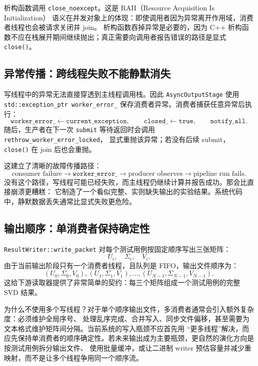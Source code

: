 析构函数调用 \texttt{close\_noexcept}。这是 RAII（Resource Acquisition Is Initialization）
语义在并发对象上的体现：即使调用者因为异常离开作用域，消费者线程也会被请求关闭并 join。
析构函数吞掉异常是必要的，因为 C++ 析构函数不应在栈展开期间继续抛出；真正需要向调用者报告错误的路径是显式
\texttt{close()}。

\subsection{异常传播：跨线程失败不能静默消失}

写线程中的异常无法直接穿透到主线程调用栈。因此 \texttt{AsyncOutputStage} 使用
\texttt{std::exception\_ptr worker\_error\_} 保存消费者异常。消费者捕获任意异常后执行：
\[
    \texttt{worker\_error\_} \leftarrow \texttt{current\_exception},
    \qquad
    \texttt{closed\_} \leftarrow \texttt{true},
    \qquad
    \texttt{notify\_all}.
\]
随后，生产者在下一次 \texttt{submit} 等待返回时会调用 \texttt{rethrow\_worker\_error\_locked}，
显式重抛该异常；若没有后续 submit，\texttt{close()} 在 join 后也会重抛。

这建立了清晰的故障传播路径：
\[
    \text{consumer failure}
    \longrightarrow
    \texttt{worker\_error\_}
    \longrightarrow
    \text{producer observes}
    \longrightarrow
    \text{pipeline run fails}.
\]
没有这个路径，写线程可能已经失败，而主线程仍继续计算并报告成功。那会比直接崩溃更糟糕：
它制造了一个看似完整、实则缺失输出的实验结果。系统代码中，静默数据丢失通常比显式失败更危险。

\subsection{输出顺序：单消费者保持确定性}

\texttt{ResultWriter::write\_packet} 对每个测试用例按固定顺序写出三张矩阵：
\[
    U_i,\quad \Sigma_i,\quad V_i.
\]
由于当前输出阶段只有一个消费者线程，且队列是 FIFO，输出文件顺序为：
\[
    (U_0,\Sigma_0,V_0),
    (U_1,\Sigma_1,V_1),
    \ldots,
    (U_{N-1},\Sigma_{N-1},V_{N-1}).
\]
这给下游读取器提供了非常简单的契约：每三个矩阵组成一个测试用例的完整 SVD 结果。

为什么不使用多个写线程？对于单个顺序输出文件，多消费者通常会引入额外复杂度：必须维护全局序号、
处理乱序完成、合并写入、同步文件偏移，甚至需要为文本格式维护矩阵间分隔。当前系统的写入瓶颈不应首先用
“更多线程”解决，而应先保持单消费者的顺序确定性。若未来输出成为主要瓶颈，更自然的演化方向是按测试用例拆分输出文件、
使用批量缓冲，或让二进制 writer 预估容量并减少重映射，而不是让多个线程争用同一个顺序流。

